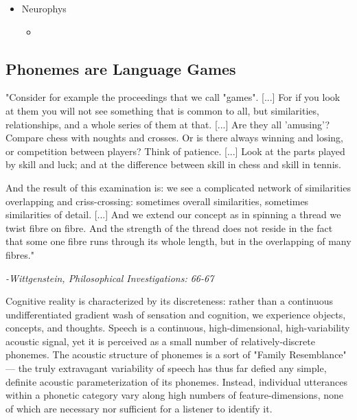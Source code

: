 \begin{multicols}{2}
\begin{itemize}
	\item Neurophys
	\begin{itemize}
		\item 
	\end{itemize}

\end{itemize}


\subsection{Phonemes are Language Games}

\begin{leftbar}

"Consider for example the proceedings that we call "games". [...] For if you look at them you will not see something that is common to all, but similarities, relationships, and a whole series of them at that. [...] Are they all 'amusing'? Compare chess with noughts and crosses. Or is there always winning and losing, or competition between players? Think of patience. [...] Look at the parts played by skill and luck; and at the difference between skill in chess and skill in tennis. 

And the result of this examination is: we see a complicated network
of similarities overlapping and criss-crossing: sometimes overall similarities, sometimes similarities of detail. [...] And we extend our concept as in spinning a thread we twist fibre on fibre. And the strength of the thread does not reside in the fact that some one fibre runs through its whole length, but in the overlapping of many fibres."

\textit{-Wittgenstein, Philosophical Investigations: 66-67\cite{wittgensteinPhilosophicalInvestigations1968}}

\end{leftbar}

Cognitive reality is characterized by its discreteness: rather than a continuous undifferentiated gradient wash of sensation and cognition, we experience objects, concepts, and thoughts. Speech is a continuous, high-dimensional, high-variability acoustic signal, yet it is perceived as a small number of relatively-discrete phonemes\cite{holtSpeechPerceptionCategorization2010a}. The acoustic structure of phonemes is a sort of "Family Resemblance"\cite{wittgensteinPhilosophicalInvestigations1968} --- the truly extravagant variability of speech has thus far defied any simple, definite acoustic parameterization of its phonemes. Instead, individual utterances within a phonetic category vary along high numbers of feature-dimensions, none of which are necessary nor sufficient for a listener to identify it\cite{Lisker1977}.






\end{multicols}
